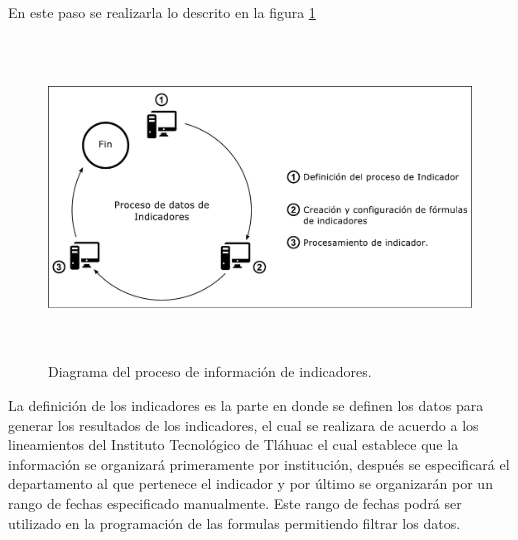 				En este paso se realizarla lo descrito  en la figura \ref{fig_ProcesoIndicador}

				\begin{figure}[H]
			        \centering
			        \includegraphics[width=16cm, height=8.5cm]{figuras/ProcesoIndicadores}
			        \caption{Diagrama del proceso de informaci\'on de indicadores.}
			        \label{fig_ProcesoIndicador}
			    \end{figure}

			    La definici\'on de los indicadores es la parte en donde se definen los datos para generar los resultados de los indicadores, el cual se realizara de acuerdo a los lineamientos del Instituto Tecnol\'ogico de Tl\'ahuac el cual establece que la informaci\'on se organizar\'a primeramente por instituci\'on, despu\'es se especificar\'a el departamento al que pertenece el indicador y por \'ultimo se organizar\'an por un rango de fechas especificado manualmente. Este rango de fechas podr\'a ser utilizado en la programaci\'on de las formulas permitiendo filtrar los datos.

